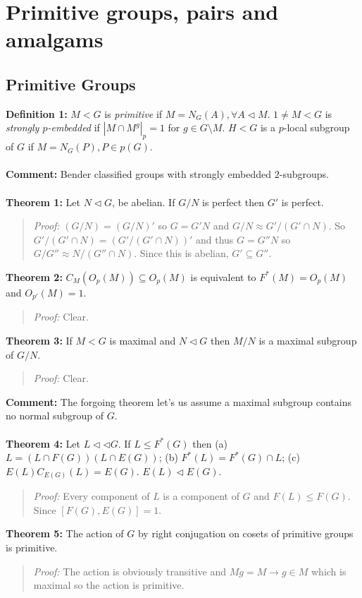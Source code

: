 \chapter{Primitive groups, pairs and amalgams}
\section {Primitive Groups}
{\bf Definition 1:} $M<G$ is \emph{primitive} if $M=N_G(A), \forall A \lhd M$. $1 \ne M <G$ is
\emph{strongly $p$-embedded} if $|M \cap M^g|_p = 1$ for $g \in G \setminus M$.
$H<G$ is a $p$-local subgroup of $G$ if $M= N_G(P), P \in p(G)$.
\\
\\
{\bf Comment:} Bender classified groups with strongly embedded $2$-subgroups.
\\
\\
{\bf Theorem 1:}
Let $N \lhd G$, be abelian.  If $G/N$ is perfect then $G'$ is perfect.
\begin{quote}
\emph{Proof:}  
$(G/N)= (G/N)'$ so $G= G'N$ and 
$G/N \approx G'/(G' \cap N)$.  So
$G'/(G' \cap N)=
(G'/(G' \cap N))'$ and thus $G=G''N$ so $G/G'' \approx N/(G'' \cap N)$.  Since this is abelian,
$G' \subseteq G''$.
\end{quote}
{\bf Theorem 2:}
$C_M(O_p(M)) \subseteq O_p(M)$ is equivalent to $F^*(M)=O_p(M)$ and $O_{p'}(M)=1$.
\begin{quote}
\emph{Proof:}  
Clear.
\end{quote}
{\bf Theorem 3:}
If $M<G$ is maximal and $N \lhd G$ then $M/N$ is a maximal subgroup of $G/N$.
\begin{quote}
\emph{Proof:}  Clear.
\end{quote}
{\bf Comment:} The forgoing theorem let's us assume a maximal subgroup contains no normal subgroup of
$G$.
\\
\\
{\bf Theorem 4:}  Let $L \lhd \lhd G$.  If $L \leq F^*(G)$ then (a)
$L= (L \cap F(G))(L \cap E(G))$; (b) $F^*(L) = F^*(G) \cap L$; (c)
$E(L) C_{E(G)}(L) = E(G)$.  $E(L) \lhd E(G)$.
\begin{quote}
\emph{Proof:}  
Every component of $L$ is a component of $G$ and $F(L) \leq F(G)$.  Since $[F(G), E(G)]=1$.
\end{quote}
{\bf Theorem 5:}  The action of $G$ by right conjugation on cosets of primitive groups is primitive.
\begin{quote}
\emph{Proof:}  The action is obviously transitive and 
$Mg=M \rightarrow g \in M$ which is maximal so the action is primitive.
\end{quote}
